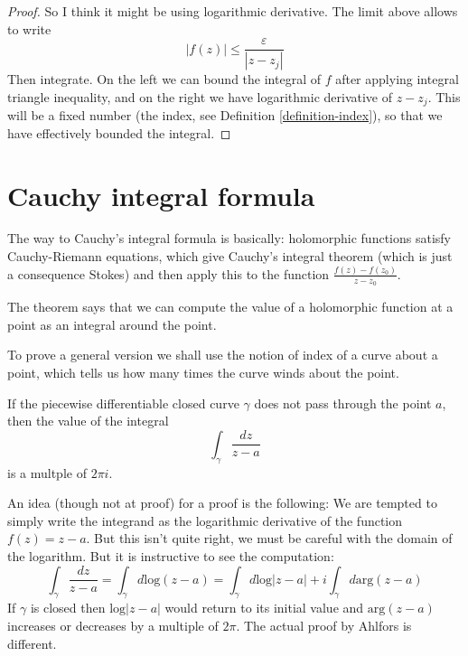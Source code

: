 \begin{proof}[Proof]
So I think it might be using logarithmic derivative. The limit above allows to
write
$$
|f(z)|\leq \frac{\varepsilon}{|z-z_j|}
$$
Then integrate. On the left we can bound the integral of $f$ after applying
integral triangle inequality, and on the right we have logarithmic derivative of
$z-z_j$. This will be a fixed number (the index, see Definition
\ref{definition-index}), so that we have effectively bounded the integral.
\end{proof}

\section{Cauchy integral formula}
\label{section-Cauchy-integral-formula}

\noindent
The way to Cauchy's integral formula is basically:
holomorphic functions satisfy Cauchy-Riemann equations,
which give Cauchy's integral theorem 
(which is just a consequence Stokes)
and then apply this to the function $\frac{f(z)-f(z_0)}{z-z_0}$.

The theorem says that we can compute the value of
a holomorphic function at a point as an integral around the point.

To prove a general version we shall use the notion of index of a curve
about a point, which tells us how many times the curve winds about the point.

\begin{lemma}
\label{lemma-index-is-multiple-of-2pii}
\begin{reference}
\cite[Section 2.2, Lemma 1]{ahl}
\end{reference}
If the piecewise differentiable closed curve $\gamma$ does not pass through the
point $a$, then the value of the integral
$$
\int_\gamma\frac{dz}{z-a}
$$
is a multple of $2\pi i$.
\end{lemma}

An idea (though not at proof) for a proof is the following:
We are tempted to simply write the integrand as the logarithmic derivative of
the function $f(z)=z-a$. But this isn't quite right, we must be careful with the
domain of the logarithm. But it is instructive to see the computation:
$$
\int_\gamma\frac{dz}{z-a}=\int_\gamma d \text{log}(z-a)=
\int_\gamma d\text{log}|z-a|+i\int_\gamma d \text{arg}(z-a)
$$
If  $\gamma$ is closed then $\text{log}|z-a|$ would return to its initial value
and $\text{arg}(z-a)$ increases or decreases by a multiple of $2\pi$. The actual
proof by Ahlfors is different.


